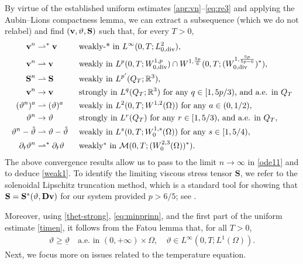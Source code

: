 \documentclass[11pt, a4paper, reqno]{amsart}
\newcommand{\R}{{\mathbb R}}
\numberwithin{equation}{section}
\newcommand{\diver}{\operatorname{div}}
\newcommand{\thetah}{\hat\thet}
\newcommand{\vc}[1]{{\bf #1}}
\newcommand{\vv}{\vc{v}}
\newcommand{\thet}{\vartheta}
\renewcommand{\S}{\mathbf{S}}
\newcommand{\D}{\mathbf{D}}
\newcommand{\QT}{Q_T}
\newcommand{\tmin}{\underline{\thet}}
\begin{document}
By virtue of the established uniform estimates \eqref{apr:vn}--\eqref{eq:re3} and applying the Aubin--Lions compactness lemma, we can extract a subsequence (which we do not relabel) and find $(\vv, \thet, \S)$ such that, for every $T>0$,
\begin{align}
 \vv^n &\rightharpoonup^* \vv && \mbox{ weakly-* in } L^\infty(0, T; L^2_{0,\diver}), \label{Linfty2}\\
 \vv^n &\rightharpoonup \vv &&\mbox{ weakly in } L^p(0, T; W^{1,p}_{0,\diver})\cap W^{1,\frac{5p}6}(0,T; (W^{1,\frac{5p}{5p-6}}_{0,\diver})^*),\label{Lp}\\
 \S^n &\rightharpoonup \S &&\mbox{ weakly in } L^{p'}(\QT; \R^3),\label{Lp-S}\\
 \vv^n&\to\vv &&\mbox{ strongly in }L^q(\QT; \R^3) \mbox{ for any $q\in [1, {5p}/{3})$, and a.e. in $\QT$} \label{v-strong}\\
 (\thet^n)^a&\rightharpoonup   (\thet)^a &&\mbox{ weakly in } L^2(0, T; W^{1,2}(\Omega)) \mbox{ for any } a\in (0, {1}/{2}),\label{thet-weak}\\
 \thet^n &\to \thet &&\mbox{ strongly in $L^r(\QT)$ for any $r\in [1, 5/3)$, and a.e. in $\QT$},\label{thet-strong}\\
  \thet^n -\thetah &\rightharpoonup \thet -\thetah && \mbox{ weakly in } L^s(0, T; W_0^{1, s}(\Omega))  \mbox{ for any } s\in [1, 5/4),\label{grad-thet-weak}\\
\partial_t\thet^n &\rightharpoonup^* \partial_t\thet && \mbox{ weakly$^*$ in } \mathcal{M}(0, T; (W_0^{2, 3}(\Omega))^*).\label{time-thet-weak}                                                   
\end{align}
The above convergence results allow us to pass to the limit $n \to \infty$ in \eqref{ode11} and to deduce \eqref{weak1}. To identify the limiting viscous stress tensor $\S$, we refer to the solenoidal Lipschitz truncation method, which is a standard tool for showing that $\S = \S^*(\thet, \D \vv)$ for our system provided $p > 6/5$; see \cite{DieRuWo2010, BreDieSchwa2013, BeMaRa20, BuGwMaSw12}.

Moreover, using \eqref{thet-strong}, \eqref{eq:minprinn}, and the first part of the uniform estimate \eqref{timen}, it follows from the Fatou lemma that, for all $T>0$,
\begin{equation}
\begin{split}\label{theinf1}
  \thet \geq \tmin \quad \mbox{a.e. in $(0,+\infty)\times\Omega$}, \quad \thet \in L^{\infty}(0,T; L^1(\Omega)).
\end{split}
\end{equation}
Next, we focus more on issues related to the temperature equation.
\end{document}
